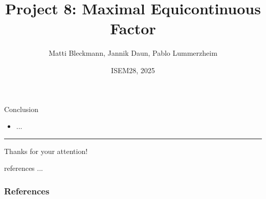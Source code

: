\documentclass[aspectratio=169]{beamer}
\title[MEF]{Project 8: Maximal Equicontinuous Factor}
\author{Matti Bleckmann, Jannik Daun, Pablo Lummerzheim}
\date{ISEM28, 2025}
\numberwithin{equation}{section}
\theoremstyle{plain}
\begin{document}
\setlength{\abovedisplayshortskip}{1pt}
\setlength{\belowdisplayshortskip}{1pt} 
\setlength{\abovedisplayskip}{1pt}
\setlength{\belowdisplayskip}{1pt}  %
\begingroup 
    \begin{frame}
        \titlepage
    \end{frame}
\endgroup




\section*{}
\begingroup 
\begin{frame}{Conclusion}
    \begin{itemize}
    \item ...
    \end{itemize}
    \hrule
    \begin{center}
\Large
    Thanks for your attention!
\end{center}
\end{frame}
  \begin{frame}
  references ...
   \frametitle{References}
    \printbibliography[heading=none]
  \end{frame}
\endgroup
\end{document}
